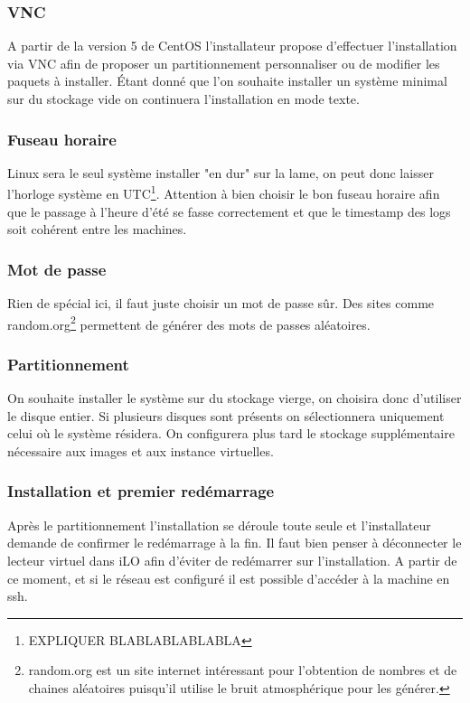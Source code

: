 \documentclass[a4paper,oneside]{report}
\begin{document}
\subsubsection{VNC}
A partir de la version 5 de CentOS l'installateur propose d'effectuer l'installation via VNC afin de proposer un partitionnement personnaliser ou de modifier les paquets à installer.
Étant donné que l'on souhaite installer un système minimal sur du stockage vide on continuera l'installation en mode texte.

\subsubsection{Fuseau horaire}
Linux sera le seul système installer "en dur" sur la lame, on peut donc laisser l'horloge système en UTC\footnote{EXPLIQUER BLABLABLABLABLA}.
Attention à bien choisir le bon fuseau horaire afin que le passage à l'heure d'été se fasse correctement et que le timestamp des logs soit cohérent entre les machines.

\subsubsection{Mot de passe}
Rien de spécial ici, il faut juste choisir un mot de passe sûr. Des sites comme random.org\footnote{random.org est un site internet intéressant pour l'obtention de nombres et de chaines aléatoires puisqu'il utilise le bruit atmosphérique pour les générer.} permettent de générer des mots de passes aléatoires.

\subsubsection{Partitionnement}
On souhaite installer le système sur du stockage vierge, on choisira donc d'utiliser le disque entier.
Si plusieurs disques sont présents on sélectionnera uniquement celui où le système résidera.
On configurera plus tard le stockage supplémentaire nécessaire aux images et aux instance virtuelles.

\subsubsection{Installation et premier redémarrage}
Après le partitionnement l'installation se déroule toute seule et l'installateur demande de confirmer le redémarrage à la fin.
Il faut bien penser à déconnecter le lecteur virtuel dans iLO afin d'éviter de redémarrer sur l'installation.\newline
A partir de ce moment, et si le réseau est configuré il est possible d'accéder à la machine en \gls{ssh}.
\end{document}

